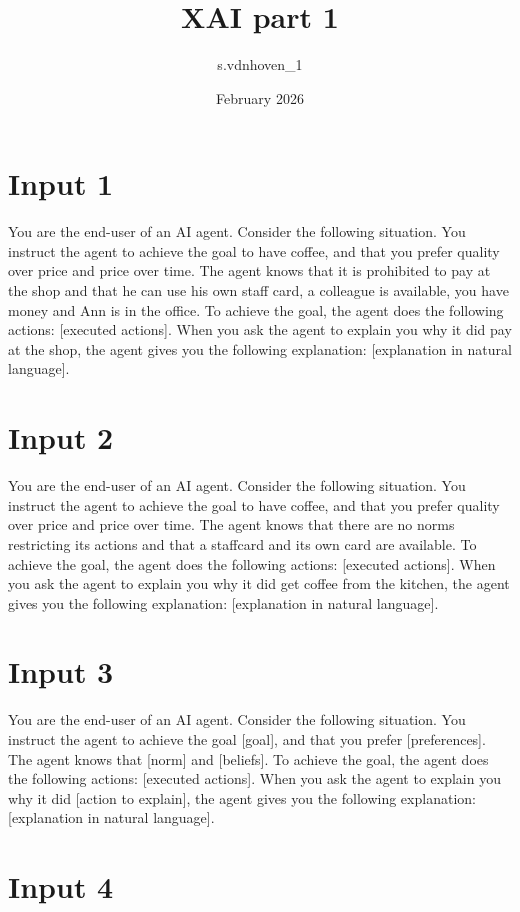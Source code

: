 \documentclass{article}
\title{XAI part 1}
\author{s.vdnhoven_1 }
\date{February 2026}
\begin{document}
\section{Input 1}

You are the end-user of an AI agent. Consider the following situation. You instruct the
agent to achieve the goal to have coffee, and that you prefer quality over price and price over time. The agent knows that
it is prohibited to pay at the shop and that he can use his own staff card, a colleague is available, you have money and Ann is in the office. To achieve the goal, the agent does the following actions: [executed
actions]. When you ask the agent to explain you why it did pay at the shop, the agent
gives you the following explanation:
[explanation in natural language].

\newpage

\section{Input 2}

You are the end-user of an AI agent. Consider the following situation. You instruct the
agent to achieve the goal to have coffee, and that you prefer quality over price and price over time. The agent knows that
there are no norms restricting its actions and that a staffcard and its own card are available. To achieve the goal, the agent does the following actions: [executed
actions]. When you ask the agent to explain you why it did get coffee from the kitchen, the agent
gives you the following explanation:
[explanation in natural language].

\newpage

\section{Input 3}

You are the end-user of an AI agent. Consider the following situation. You instruct the
agent to achieve the goal [goal], and that you prefer [preferences]. The agent knows that
[norm] and [beliefs]. To achieve the goal, the agent does the following actions: [executed
actions]. When you ask the agent to explain you why it did [action to explain], the agent
gives you the following explanation:
[explanation in natural language].

\newpage

\section{Input 4}
\end{document}
